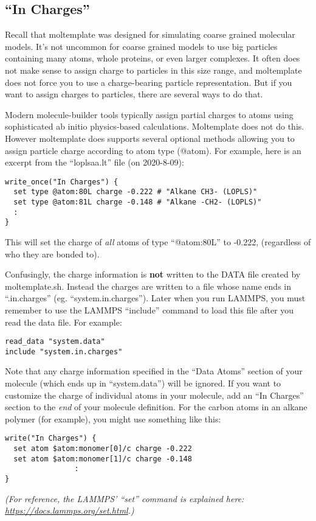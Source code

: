 \documentclass[11pt]{article}
\begin{document}
\subsection{``In Charges''}
\label{sec:in_charges}
Recall that moltemplate was designed for simulating coarse grained molecular
models.  It's not uncommon for coarse grained models to use big particles
containing many atoms, whole proteins, or even larger complexes.  It often
does not make sense to assign charge to particles in this size range, and
moltemplate does not force you to use a charge-bearing particle representation.
But if you want to assign charges to particles, there are several ways to do
that.

Modern molecule-builder tools typically assign partial charges to atoms
using sophisticated ab initio physics-based calculations.
Moltemplate does not do this.
However moltemplate does supports several optional methods
allowing you to assign particle charge according to atom type (@atom).
For example, here is an excerpt
from the ``loplsaa.lt'' file (on 2020-8-09):
\begin{verbatim}
write_once("In Charges") {
  set type @atom:80L charge -0.222 # "Alkane CH3- (LOPLS)"
  set type @atom:81L charge -0.148 # "Alkane -CH2- (LOPLS)"
  :
}
\end{verbatim}
This will set the charge of \textit{all} atoms of type ``@atom:80L'' to -0.222,
(regardless of who they are bonded to).

Confusingly, the charge information is \textbf{not} written to the DATA
file created by moltemplate.sh.  Instead the charges are written to a
file whose name ends in ``.in.charges'' (eg. ``system.in.charges'').
Later when you run LAMMPS, you must remember to use the LAMMPS ``include''
command to load this file after you read the data file.  For example:
\begin{verbatim}
read_data "system.data"
include "system.in.charges"
\end{verbatim}

Note that any charge information specified in the ``Data Atoms'' section
of your molecule (which ends up in ``system.data'') will be ignored.
If you want to customize the charge of individual atoms in your molecule,
add an ``In Charges'' section to the \textit{end} of your molecule definition.
For the carbon atoms in an alkane polymer (for example),
you might use something like this:
\begin{verbatim}
write("In Charges") {
  set atom $atom:monomer[0]/c charge -0.222
  set atom $atom:monomer[1]/c charge -0.148
                :
}
\end{verbatim}
\textit{(For reference, the LAMMPS' ``set'' command is explained here:
        \url{https://docs.lammps.org/set.html}.)}
\end{document}
